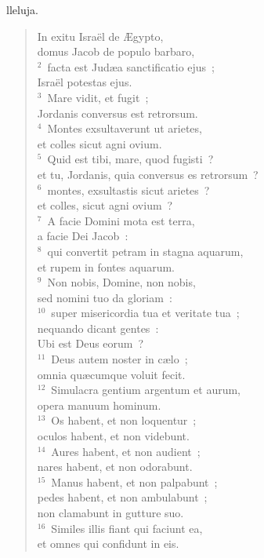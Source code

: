 \bchapter[Psalm]
lleluja. \begin{verse}In exitu Isra\"el de \AE gypto,\\ domus Jacob de populo barbaro,\\
${}^{2}$~facta est Jud\ae a sanctificatio ejus~;\\ Isra\"el potestas ejus.\\
${}^{3}$~Mare vidit, et fugit~;\\ Jordanis conversus est retrorsum.\\
${}^{4}$~Montes exsultaverunt ut arietes,\\ et colles sicut agni ovium.\\
${}^{5}$~Quid est tibi, mare, quod fugisti~?\\ et tu, Jordanis, quia conversus es retrorsum~?\\
${}^{6}$~montes, exsultastis sicut arietes~?\\ et colles, sicut agni ovium~?\\
${}^{7}$~A facie Domini mota est terra,\\ a facie Dei Jacob~:\\
${}^{8}$~qui convertit petram in stagna aquarum,\\ et rupem in fontes aquarum.\\
${}^{9}$~Non nobis, Domine, non nobis,\\ sed nomini tuo da gloriam~:\\
${}^{10}$~super misericordia tua et veritate tua~;\\ nequando dicant gentes~:\\ Ubi est Deus eorum~?\\
${}^{11}$~Deus autem noster in c\ae lo~;\\ omnia qu\ae cumque voluit fecit.\\
${}^{12}$~Simulacra gentium argentum et aurum,\\ opera manuum hominum.\\
${}^{13}$~Os habent, et non loquentur~;\\ oculos habent, et non videbunt.\\
${}^{14}$~Aures habent, et non audient~;\\ nares habent, et non odorabunt.\\
${}^{15}$~Manus habent, et non palpabunt~;\\ pedes habent, et non ambulabunt~;\\ non clamabunt in gutture suo.\\
${}^{16}$~Similes illis fiant qui faciunt ea,\\ et omnes qui confidunt in eis.\\

\end{verse}
